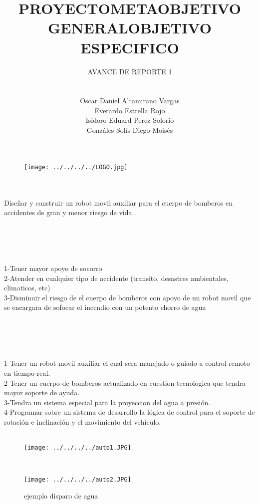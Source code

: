 \documentclass[12pt]{article}
\title{PROYECTO}
\author{AVANCE DE REPORTE 1\\ \\ \\ Oscar Daniel Altamirano Vargas\\ 
Everardo Estrella Rojo \\ Isidoro Eduard Perez Solorio \\
Gonzáles Solís Diego Moisés}
\begin{document}
 
\maketitle
\begin{figure}[hbtp]
\centering
\texttt{[image: ../../../../LOGO.jpg]}
\end{figure}
\pagebreak
\title{META} \\ \\
Diseñar y construir un robot movil auxiliar para el cuerpo de bomberos en accidentes de gran y menor riesgo de vida \\ \\ \\
\title{OBJETIVO GENERAL} \\ \\
1-Tener mayor apoyo de socorro\\
2-Atender en cualquier tipo de accidente (transito, desastres ambientales, climaticos, etc)\\
3-Disminuir el riesgo de el cuerpo de bomberos con apoyo de un robot movil que se encargara de sofocar el incendio con un potento chorro de agua \\ \\ \\
\title{OBJETIVO ESPECIFICO} \\ \\
1-Tener un robot movil auxiliar el cual sera manejado o guiado a control remoto en tiempo real. \\
2-Tener un cuerpo de bomberos actualizado en cuestion tecnologica que tendra mayor soporte de ayuda. \\
3-Tendra un sistema especial para la proyeccion del agua a presión. \\
4-Programar sobre un sistema de desarrollo la lógica de control para el soporte de rotación e inclinación y el movimiento del vehículo.\\ \\ 
\begin{figure}[hbtp]
\caption{}
\centering
\texttt{[image: ../../../../auto1.JPG]}
\end{figure} \\
\begin{figure}[hbtp]
\caption{ejemplo disparo de agua}
\centering
\texttt{[image: ../../../../auto2.JPG]}
\end{figure}








 
\end{document}
